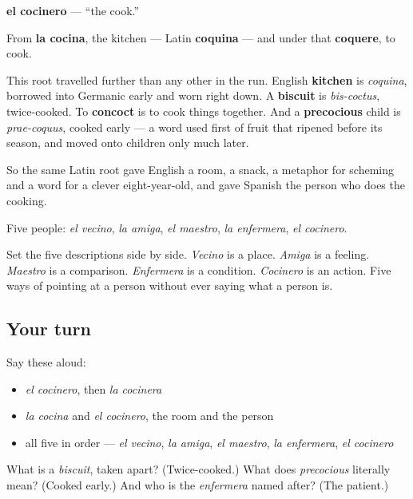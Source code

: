 \begin{cousinweb}
\textbf{el cocinero} — \textquotedblleft{}the cook.\textquotedblright{}

From \textbf{la cocina}, the kitchen — Latin \textbf{coquina} — and under that \textbf{coquere}, to cook.

This root travelled further than any other in the run. English \textbf{kitchen} is \emph{coquina}, borrowed into Germanic early and worn right down. A \textbf{biscuit} is \emph{bis-coctus}, twice-cooked. To \textbf{concoct} is to cook things together. And a \textbf{precocious} child is \emph{prae-coquus}, cooked early — a word used first of fruit that ripened before its season, and moved onto children only much later.

So the same Latin root gave English a room, a snack, a metaphor for scheming and a word for a clever eight-year-old, and gave Spanish the person who does the cooking.
\end{cousinweb}

\begin{grammarlens}[title={What you've built}]
Five people: \emph{el vecino}, \emph{la amiga}, \emph{el maestro}, \emph{la enfermera}, \emph{el cocinero}.

Set the five descriptions side by side. \emph{Vecino} is a place. \emph{Amiga} is a feeling. \emph{Maestro} is a comparison. \emph{Enfermera} is a condition. \emph{Cocinero} is an action. Five ways of pointing at a person without ever saying what a person is.
\end{grammarlens}

\subsection*{Your turn}
Say these aloud:

\begin{itemize}
\raggedright
  \item \emph{el cocinero}, then \emph{la cocinera}
  \item \emph{la cocina} and \emph{el cocinero}, the room and the person
  \item all five in order — \emph{el vecino}, \emph{la amiga}, \emph{el maestro}, \emph{la enfermera}, \emph{el cocinero}
\end{itemize}

\begin{tcolorbox}[breakable,colback=teal!4,colframe=teal!35!black,title={Before you move on}]
What is a \emph{biscuit}, taken apart? (Twice-cooked.) What does \emph{precocious} literally mean? (Cooked early.) And who is the \emph{enfermera} named after? (The patient.)
\end{tcolorbox}
